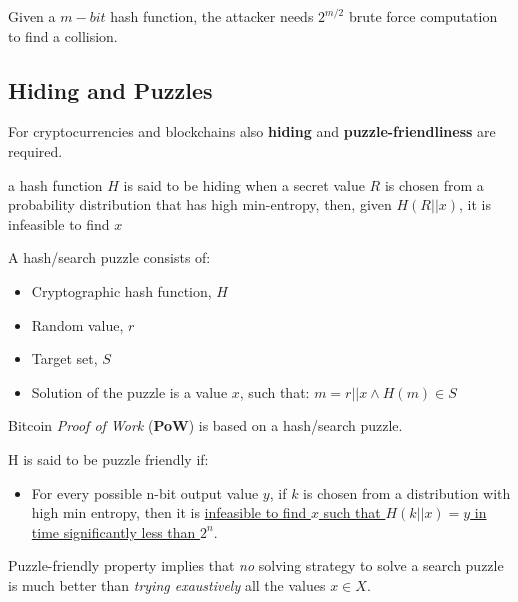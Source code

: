 Given a $m-bit$ hash function, the attacker needs $2^{m/2}$ brute force computation to
find a collision.

\subsection{Hiding and Puzzles}
For cryptocurrencies and blockchains also \textbf{hiding} and \textbf{puzzle-friendliness} are required.
\begin{definition}[Hiding]
a hash function $H$ is said to be hiding when a secret value $R$ is chosen from
a probability distribution that has high min-entropy, then, given  $H(R || x)$, it is infeasible to find $x$
\end{definition}
\nl

A hash/search puzzle consists of:
\begin{itemize}
   \item Cryptographic hash function, $H$
   \item Random value, $r$
   \item Target set, $S$
   \item Solution of the puzzle is a value $x$, such that:
   $m = r || x \wedge H(m) \in S$
\end{itemize}
Bitcoin \textit{Proof of Work} (\textbf{PoW}) is based on a hash/search puzzle.
\begin{definition}
   H is said to be puzzle friendly if:
   \begin{itemize}
      \item For every possible n-bit output value $y$, if $k$ is chosen from a distribution with high min entropy, then it is \ul{infeasible to find $x$ such that $H(k || x) = y$ in time significantly less than $2^n$}.
   \end{itemize}
\end{definition}
Puzzle-friendly property implies that
\textit{no} solving strategy to solve a search puzzle is much better than \textit{trying exaustively} all the values $x \in X$.